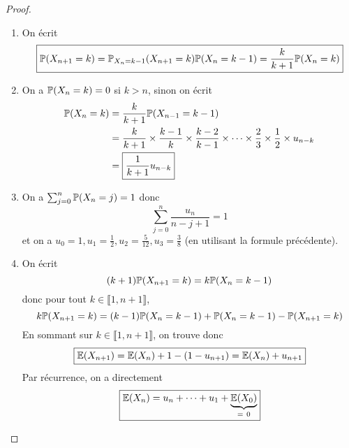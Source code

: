 \begin{proof}
    \phantom{}
    \begin{enumerate}
        \item On écrit 
        \begin{equation}
            \boxed{\P(X_{n+1}=k)=\P_{X_{n}=k-1}(X_{n+1}=k)\P(X_{n}=k-1)=\frac{k}{k+1}\P(X_{n}=k)}
        \end{equation}

        \item On a $\P(X_{n}=k)=0$ si $k>n$, sinon on écrit 
        \begin{align}
            \P(X_{n}=k)
            &=\frac{k}{k+1}\P(X_{n-1}=k-1)\\
            &=\frac{k}{k+1}\times\frac{k-1}{k}\times\frac{k-2}{k-1}\times\dots\times\frac{2}{3}\times\frac{1}{2}\times u_{n-k}\\
            &=\boxed{\frac{1}{k+1}u_{n-k}}
        \end{align}

        \item On a $\sum_{j=0}^{n}\P(X_{n}=j)=1$ donc 
        \begin{equation}
            \boxed{\sum_{j=0}^{n}\frac{u_{n}}{n-j+1}=1}
        \end{equation}
        et on a $u_{0}=1,u_{1}=\frac{1}{2},u_{2}=\frac{5}{12},u_{3}=\frac{3}{8}$ (en utilisant la formule précédente).

        \item On écrit 
        \begin{equation}
            (k+1)\P(X_{n+1}=k)=k\P(X_{n}=k-1)
        \end{equation}
        donc pour tout $k\in\llbracket1,n+1\rrbracket$, 
        \begin{equation}
            k\P(X_{n+1}=k)=(k-1)\P(X_{n}=k-1)+\P(X_{n}=k-1)-\P(X_{n+1}=k)
        \end{equation}
        En sommant sur $k\in\llbracket1,n+1\rrbracket$, on trouve donc 
        \begin{equation}
            \boxed{\E(X_{n+1})=\E(X_{n})+1-(1-u_{n+1})=\E(X_{n})+u_{n+1}}
        \end{equation}
        Par récurrence, on a directement 
        \begin{equation}
            \boxed{\E(X_{n})=u_{n}+\dots+u_{1}+\underbrace{\E(X_{0})}_{{=~0}}}
        \end{equation}


\end{enumerate}
\end{proof}
